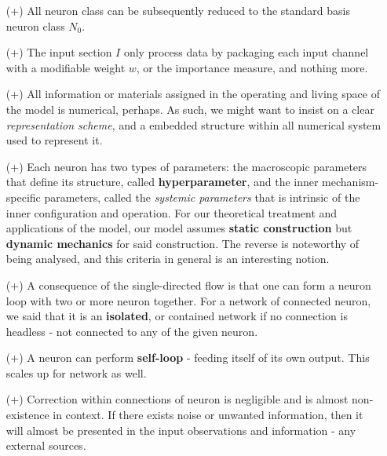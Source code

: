 \begin{itemize}[itemsep=1pt, topsep=3pt,leftmargin=4pt]
    \item[(+)] All neuron class can be subsequently reduced to the standard basis neuron class $N_{0}$. 
    \item[(+)] The input section $I$ only process data by packaging each input channel with a modifiable weight $w$, or the importance measure, and nothing more. 
    \item[(+)] All information or materials assigned in the operating and living space of the model is numerical, perhaps. As such, we might want to insist on a clear \textit{representation scheme}, and a embedded structure within all numerical system used to represent it. 
    \item[(+)] Each neuron has two types of parameters: the macroscopic parameters that define its structure, called \textbf{hyperparameter}, and the inner mechanism-specific parameters, called the \textit{systemic parameters} that is intrinsic of the inner configuration and operation. For our theoretical treatment and applications of the model, our model assumes \textbf{static construction} but \textbf{dynamic mechanics} for said construction. The reverse is noteworthy of being analysed, and this criteria in general is an interesting notion. 
    \item[(+)] A consequence of the single-directed flow is that one can form a neuron loop with two or more neuron together. For a network of connected neuron, we said that it is an \textbf{isolated}, or contained network if no connection is headless - not connected to any of the given neuron. 
    \item[(+)] A neuron can perform \textbf{self-loop} - feeding itself of its own output. This scales up for network as well.  
    \item[(+)] Correction within connections of neuron is negligible and is almost non-existence in context. If there exists noise or unwanted information, then it will almost be presented in the input observations and information - any external sources. 
\end{itemize}

